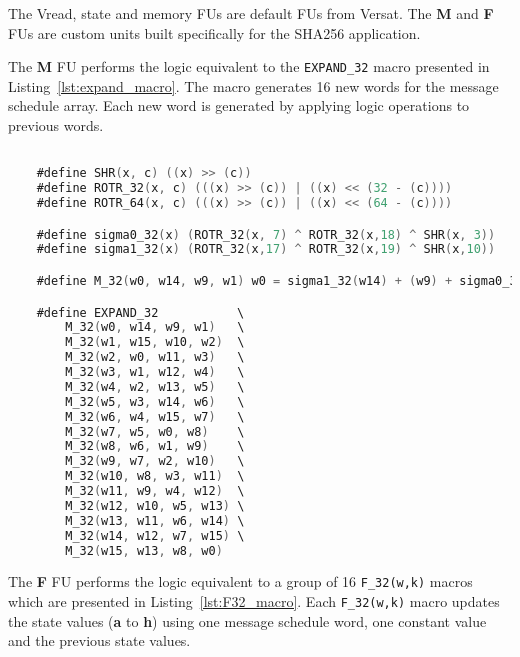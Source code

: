 The Vread, state and memory FUs are default FUs from Versat. The \textbf{M} and
\textbf{F} FUs are custom units built specifically for the SHA256 application.

The \textbf{M} FU performs the logic equivalent to the \texttt{EXPAND\_32}
macro presented in Listing~\ref{lst:expand_macro}. The macro generates 16 new
words for the message schedule array. Each new word is generated by applying
logic operations to previous words.

\begin{lstlisting}[language=C,caption={\texttt{EXPAND\_32} macro.},
label={lst:expand_macro}]

    #define SHR(x, c) ((x) >> (c))
    #define ROTR_32(x, c) (((x) >> (c)) | ((x) << (32 - (c))))
    #define ROTR_64(x, c) (((x) >> (c)) | ((x) << (64 - (c))))

    #define sigma0_32(x) (ROTR_32(x, 7) ^ ROTR_32(x,18) ^ SHR(x, 3))
    #define sigma1_32(x) (ROTR_32(x,17) ^ ROTR_32(x,19) ^ SHR(x,10))

    #define M_32(w0, w14, w9, w1) w0 = sigma1_32(w14) + (w9) + sigma0_32(w1) + (w0);

    #define EXPAND_32           \
        M_32(w0, w14, w9, w1)   \
        M_32(w1, w15, w10, w2)  \
        M_32(w2, w0, w11, w3)   \
        M_32(w3, w1, w12, w4)   \
        M_32(w4, w2, w13, w5)   \
        M_32(w5, w3, w14, w6)   \
        M_32(w6, w4, w15, w7)   \
        M_32(w7, w5, w0, w8)    \
        M_32(w8, w6, w1, w9)    \
        M_32(w9, w7, w2, w10)   \
        M_32(w10, w8, w3, w11)  \
        M_32(w11, w9, w4, w12)  \
        M_32(w12, w10, w5, w13) \
        M_32(w13, w11, w6, w14) \
        M_32(w14, w12, w7, w15) \
        M_32(w15, w13, w8, w0)

\end{lstlisting}

The \textbf{F} FU performs the logic equivalent to a group of 16
\texttt{F\_32(w,k)} macros which are presented in Listing~\ref{lst:F32_macro}.
Each \texttt{F\_32(w,k)} macro updates the state values (\textbf{a} to
\textbf{h}) using one message schedule word, one constant value and the
previous state values.

